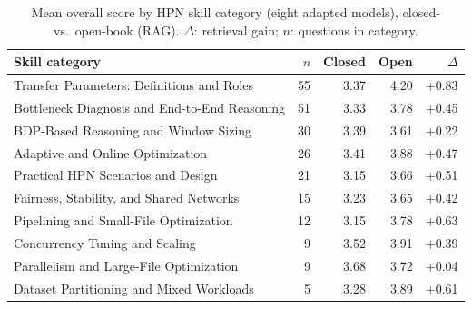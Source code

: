\begin{table}[t]\centering\footnotesize
\caption{Mean overall score by HPN skill category (eight adapted models), closed- vs.\ open-book (RAG). $\Delta$: retrieval gain; $n$: questions in category.}
\label{tab:bycat}
\begin{tabular}{@{}p{}rrrr@{}}
\toprule
Skill category & $n$ & Closed & Open & $\Delta$ \\ \midrule
Transfer Parameters: Definitions and Roles & 55 & 3.37 & 4.20 & +0.83 \\
Bottleneck Diagnosis and End-to-End Reasoning & 51 & 3.33 & 3.78 & +0.45 \\
BDP-Based Reasoning and Window Sizing & 30 & 3.39 & 3.61 & +0.22 \\
Adaptive and Online Optimization & 26 & 3.41 & 3.88 & +0.47 \\
Practical HPN Scenarios and Design & 21 & 3.15 & 3.66 & +0.51 \\
Fairness, Stability, and Shared Networks & 15 & 3.23 & 3.65 & +0.42 \\
Pipelining and Small-File Optimization & 12 & 3.15 & 3.78 & +0.63 \\
Concurrency Tuning and Scaling & 9 & 3.52 & 3.91 & +0.39 \\
Parallelism and Large-File Optimization & 9 & 3.68 & 3.72 & +0.04 \\
Dataset Partitioning and Mixed Workloads & 5 & 3.28 & 3.89 & +0.61 \\
\bottomrule
\end{tabular}
\end{table}
